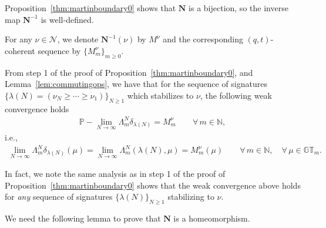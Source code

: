 \documentclass[pdftex]{sigma}
\numberwithin{equation}{section}
\newcommand{\N}{\mathbb{N}}
\newcommand{\Nu}{\mathcal{N}}
\newcommand{\GT}{\mathbb{GT}}
\newcommand{\NN}{\mathbf{N}}
\begin{document}
Proposition~\ref{thm:martinboundary0} shows that $\NN$ is a bijection, so the inverse map $\NN^{-1}$ is well-def\/ined.
\begin{df}
For any $\nu\in\Nu$, we denote $\NN^{-1}(\nu)$ by $M^{\nu}$ and the corresponding $(q, t)$-coherent sequence by $\{M^{\nu}_m\}_{m \geq 0}$.
\end{df}
From step 1 of the proof of Proposition~\ref{thm:martinboundary0}, and Lemma~\ref{lem:commutingops}, we have that for the sequence of signatures $\{\lambda(N) = (\nu_N \geq \cdots \geq \nu_1)\}_{N \geq 1}$ which stabilizes to $\nu$, the following weak convergence holds
\begin{gather*}
\mathbb{P}-\lim_{N\rightarrow\infty}{\Lambda^N_m \delta_{\lambda(N)}} = M^{\nu}_m \qquad \forall\, m\in\N,
\end{gather*}
i.e.,
\begin{gather*}
\lim_{N\rightarrow\infty}{\Lambda^N_m \delta_{\lambda(N)}}(\mu) = \lim_{N\rightarrow\infty}{\Lambda^N_m(\lambda(N), \mu)} = M^{\nu}_m(\mu) \qquad \forall \, m\in\N, \quad \forall\, \mu\in\GT_m.
\end{gather*}

In fact, we note the same analysis as in step 1 of the proof of Proposition~\ref{thm:martinboundary0} shows that the weak convergence above holds for \textit{any} sequence of signatures $\{\lambda(N)\}_{N\geq 1}$ stabilizing to $\nu$.

We need the following lemma to prove that $\NN$ is a homeomorphism.
\end{document}
